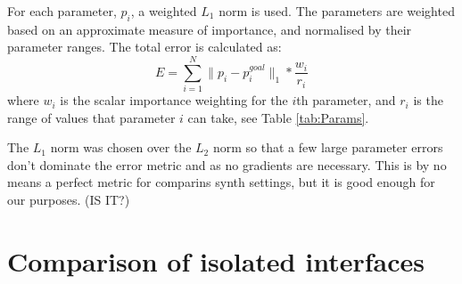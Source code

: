 \documentclass[11pt, oneside]{report}   	%
\begin{document}
For each parameter, $p_i$, a weighted $L_1$ norm is used. The parameters are weighted based on an approximate measure of importance, and normalised by their parameter ranges. The total error is calculated as:
\begin{equation}
E = \sum_{i=1}^{N} \| p_i - p_i^{goal} \|_1 *\frac{w_i}{r_i}
\end{equation}
where $w_i$ is the scalar importance weighting for the $i$th parameter, and $r_i$ is the range of values that parameter $i$ can take, see Table \ref{tab:Params}.

The $L_1$ norm was chosen over the $L_2$ norm so that a few large parameter errors don't dominate the error metric and as no gradients are necessary.
This is by no means a perfect metric for comparins synth settings, but it is good enough for our purposes. (IS IT?)

\section{Comparison of isolated interfaces}
\end{document}
